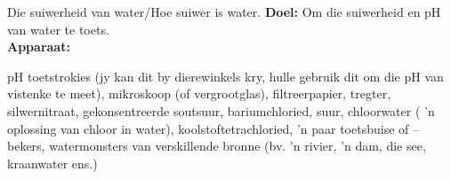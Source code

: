             \begin{g_experiment}{Die suiwerheid van water/Hoe suiwer is water.}
            \nopagebreak
            \label{m38138*id08341}\noindent{}\textbf{Doel:}\newline
Om die suiwerheid en pH van water te toets.
\\
\label{m38138*id083244}\noindent{}\textbf{Apparaat:}\\
\begin{minipage}{.5\textwidth}
pH toetstrokies (jy kan dit by dierewinkels kry, hulle gebruik dit om die pH van vistenke te meet), mikroskoop (of vergrootglas), filtreerpapier, tregter, silwernitraat, gekonsentreerde soutsuur, bariumchloried, suur, chloorwater ( 'n oplossing van chloor in water), koolstoftetrachloried,  'n paar toetsbuise of –bekers, watermonsters van verskillende bronne (bv.  'n rivier,  'n dam, die see, kraanwater ens.)
\end{minipage}
\begin{minipage}{.5\textwidth}


\end{minipage}
\end{g_experiment}
